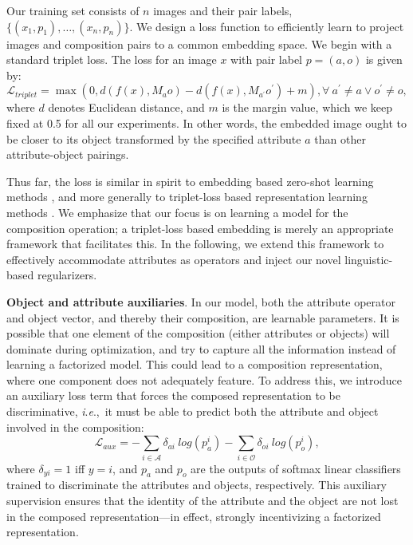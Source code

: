 \documentclass[runningheads]{llncs}
\newcommand{\ie}{\textit{i}.\textit{e}.,~}
\begin{document}
Our training set consists of $n$ images and their pair labels, $\{(x_1,p_1),\dots,(x_n,p_n)\}$.  
We design a loss function to efficiently learn to project images and composition pairs  to a common embedding space. We begin with a standard triplet loss. The loss for an image $x$ with pair label $p=(a,o)$ is given by:
\begin{equation}
\mathcal{L}_{triplet} =  \max \left ( 0, d(f(x), M_ao) - d(f(x), M_{a^\prime}o^\prime) + m \right ),
\forall\ a^\prime \neq a \lor o^\prime \neq o,
\label{eq:triplet}
\end{equation}
where $d$ denotes Euclidean distance, and $m$ is the margin value, which we keep fixed at 0.5 for all our experiments. In other words, the embedded image ought to be closer to its object transformed by the specified attribute $a$ than other attribute-object pairings.

Thus far, the loss is similar in spirit to embedding based zero-shot learning methods \cite{xian2017zero}, and more generally to triplet-loss based representation learning methods \cite{cheng2016person,hoffer2015deep,schroff2015facenet}. We emphasize that our focus is on learning a model for the composition operation; a triplet-loss based embedding is merely an appropriate framework that facilitates this. In the following, we extend this framework to effectively accommodate attributes as operators and inject our novel linguistic-based regularizers.

\vspace{0.05in}
\noindent\textbf{Object and attribute auxiliaries}.
In our model, both the attribute operator and object vector, and thereby their composition, are learnable parameters. It is possible that one element of the composition (either attributes or objects) will dominate during optimization, and try to capture all the information instead of learning a factorized model. This could lead to a composition representation, where one component does not adequately feature. To address this, we introduce an auxiliary loss term that forces the composed representation to be discriminative, \ie it must be able to predict both the attribute and object involved in the composition:
\begin{equation}
\mathcal{L}_{aux} = - \sum_{i \in \mathcal{A}} \delta_{ai}\ log(p_{a}^{i}) - \sum_{i \in \mathcal{O}} \delta_{oi}\ log(p_{o}^{i}),
\end{equation}
where $\delta_{yi}=1$ iff $y=i$, and $p_a$ and $p_o$ are the outputs of softmax linear classifiers trained to discriminate the attributes and objects, respectively. 
This auxiliary supervision ensures that the identity of the attribute and the object are not lost in the composed representation---in effect, strongly incentivizing a factorized representation.
\end{document}
